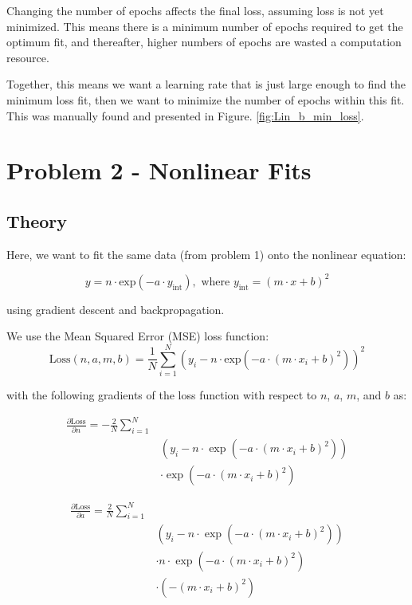 \documentclass[letterpaper, 10 pt, conference]{ieeeconf}  %
\begin{document}
Changing the number of epochs affects the final loss, assuming loss is not yet minimized. 
This means there is a minimum number of epochs required to get the optimum fit, and thereafter, higher numbers of epochs are wasted a computation resource.

Together, this means we want a learning rate that is just large enough to find the minimum loss fit, then we want to minimize the number of epochs within this fit.
This was manually found and presented in Figure. \ref{fig:Lin_b_min_loss}. 

\section{Problem 2 - Nonlinear Fits}

\subsection{Theory}

Here, we want to fit the same data (from problem 1) onto the nonlinear equation:

\begin{equation}
   y = n \cdot \text{exp}(-a \cdot y_{\text{int}}), 
   \text{ where }
   y_{\text{int}} = (m\cdot x + b)^2
\end{equation}

using gradient descent and backpropagation.

We use the Mean Squared Error (MSE) loss function: 
\begin{equation}
   \text{Loss}(n,a,m,b) = \frac{1}{N} \sum^{N}_{i=1}(y_i - n \cdot \text{exp}(-a \cdot (m \cdot x_i + b)^2) )^2
\end{equation}

with the following gradients of the loss function with respect to $n$, $a$, $m$, and $b$ as:

\begin{equation}
   \begin{aligned}
   \frac{\partial \text{Loss}}{\partial n} = -\frac{2}{N} \sum_{i=1}^N \\
   & \left( y_i - n \cdot \exp\left(-a \cdot \left(m \cdot x_i + b\right)^2\right) \right) \\
   & \cdot \exp\left(-a \cdot \left(m \cdot x_i + b\right)^2\right)
   \end{aligned}
\end{equation}

\begin{equation}
   \begin{aligned}
   \frac{\partial \text{Loss}}{\partial a} = \frac{2}{N} \sum_{i=1}^N \\
   & \left( y_i - n \cdot \exp\left(-a \cdot \left(m \cdot x_i + b\right)^2\right) \right) \\
   & \cdot n \cdot \exp\left(-a \cdot \left(m \cdot x_i + b\right)^2\right) \\
   & \cdot \left(-\left(m \cdot x_i + b\right)^2\right)
   \end{aligned}
\end{equation}
\end{document}
